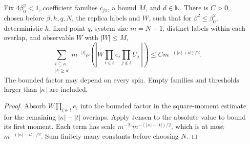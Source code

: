 \begin{lemma}
\label{lem:sg-tal:correction-absolute-moments}
\leanok
{}
Fix $4\beta_0^2<1$, coefficient families $c_{jx}$, a bound $M$, and $d\in\mathbb N$.
There is $C>0$, chosen before $\beta,h,q,N$, the replica labels and $W$, such that
for $\beta^2\le\beta_0^2$, deterministic $h$, fixed point $q$, system size $m=N+1$,
distinct labels within each overlap, and observable $W$ with $|W|\le M$,
\[
 \sum_{\substack{t\subseteq\kappa\\|t|\ge d}}m^{-|t|}
 \nu\left(\left|W\prod_{i\in t}e_i\prod_{j\notin t}U_j^-\right|\right)
 \le C m^{-(|\kappa|+d)/2}.
\]
The bounded factor may depend on every spin. Empty families and thresholds larger than
$|\kappa|$ are included.
\end{lemma}
\begin{proof}
\leanok
Absorb $W\prod_{i\in t}e_i$ into the bounded factor in the square-moment estimate for
the remaining $|\kappa|-|t|$ overlaps. Apply Jensen to the absolute value to bound its
first moment. Each term has scale $m^{-|t|}m^{-(|\kappa|-|t|)/2}$, which is at most
$m^{-(|\kappa|+d)/2}$. Sum finitely many constants before choosing $N$.
\end{proof}

